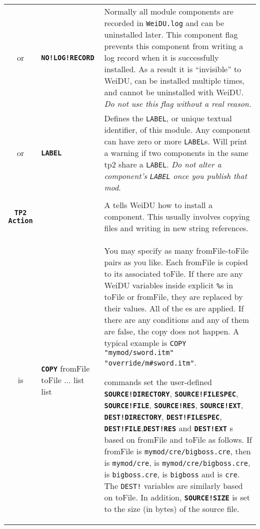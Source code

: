 \documentclass{article}
\def\ttref#1{\ahrefloc{#1}{\tt #1}}
\def\DEFINE#1{{\tt \bf #1}\label{#1}\index{#1}}
\def\t#1{{\tt #1}}
\def\Slist{{\color{red} list }}
\begin{document}
\begin{tabular}{cp{10in}|p{10in}}
  or & \DEFINE{NO!LOG!RECORD} &
      Normally all module components are recorded in \t{WeiDU.log} and can
      be uninstalled later. This component flag prevents this component
      from writing a log record when it is successfully installed. As a
      result it is ``invisible'' to WeiDU, can be installed multiple times,
      and cannot be uninstalled with WeiDU. \emph{Do not use this flag without
	  a real reason.} \\
  or & \DEFINE{LABEL} \ttref{String} &
      Defines the \t{LABEL}, or unique textual identifier, of this
      module. Any component can have zero or more \t{LABEL}s. Will
      print a warning if two components in the same tp2 share a
      \t{LABEL}. \emph{Do not alter a component's \t{LABEL} once you
        publish that mod}. \\ \\

\DEFINE{TP2 Action} & &
  A \ttref{TP2 Action} tells WeiDU how to install a component. This usually
  involves copying files and writing in new string references. \\

  is & \DEFINE{COPY} \ttref{optNoBackup}
                     \ttref{optGlob} fromFile toFile ...
       \ttref{patch} \Slist
       \ttref{when} \Slist &
       You may specify as many fromFile-toFile pairs as you like. Each
       fromFile is copied to its associated toFile. If there are any WeiDU
       variables inside explicit \t{\%}s in toFile or fromFile, they are
       replaced by their values. All of the
       \ttref{patch}es are applied. If there are any \ttref{when}
       conditions and any of them are false, the copy does not happen.
       A typical example is \t{COPY "mymod/sword.itm"
       "override/m\#sword.itm"}.


       \ttref{COPY} commands set the user-defined \DEFINE{SOURCE!DIRECTORY},
       \DEFINE{SOURCE!FILESPEC}, \DEFINE{SOURCE!FILE},
       \DEFINE{SOURCE!RES}, \DEFINE{SOURCE!EXT},
       \DEFINE{DEST!DIRECTORY}, \DEFINE{DEST!FILESPEC},
       \DEFINE{DEST!FILE},\DEFINE{DEST!RES} and \DEFINE{DEST!EXT}
       \ttref{variable}s based on fromFile and toFile as follows. If
       fromFile is \t{mymod/cre/bigboss.cre}, then
       \ttref{SOURCE!DIRECTORY} is \t{mymod/cre},
       \ttref{SOURCE!FILESPEC} is \t{mymod/cre/bigboss.cre},
       \ttref{SOURCE!FILE} is \t{bigboss.cre},
       \ttref{SOURCE!RES} is \t{bigboss} and \ttref{SOURCE!EXT} is \t{cre}.
       The \t{DEST!} variables
       are similarly based on toFile. In addition, \DEFINE{SOURCE!SIZE} is
       set to the size (in bytes) of the source file.



\end{tabular}
\end{document}
